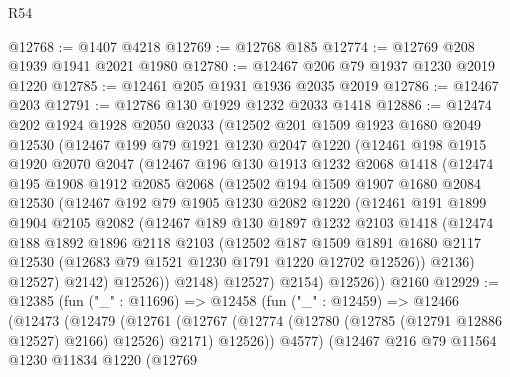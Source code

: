 \begin{lexlean}{R54}
\begin{coremodule}
@12768 := @1407 @4218
@12769 := @12768 @185
@12774 := @12769 @208 @1939 @1941 @2021 @1980
@12780 := @12467 @206 @79 @1937 @1230 @2019 @1220
@12785 := @12461 @205 @1931 @1936 @2035 @2019
@12786 := @12467 @203
@12791 := @12786 @130 @1929 @1232 @2033 @1418
@12886 := @12474
    @202
    @1924
    @1928
    @2050
    @2033
    (@12502
      @201
      @1509
      @1923
      @1680
      @2049
      @12530
      (@12467
        @199
        @79
        @1921
        @1230
        @2047
        @1220
        (@12461
          @198
          @1915
          @1920
          @2070
          @2047
          (@12467
            @196
            @130
            @1913
            @1232
            @2068
            @1418
            (@12474
              @195
              @1908
              @1912
              @2085
              @2068
              (@12502
                @194
                @1509
                @1907
                @1680
                @2084
                @12530
                (@12467
                  @192
                  @79
                  @1905
                  @1230
                  @2082
                  @1220
                  (@12461
                    @191
                    @1899
                    @1904
                    @2105
                    @2082
                    (@12467
                      @189
                      @130
                      @1897
                      @1232
                      @2103
                      @1418
                      (@12474
                        @188
                        @1892
                        @1896
                        @2118
                        @2103
                        (@12502
                          @187
                          @1509
                          @1891
                          @1680
                          @2117
                          @12530
                          (@12683 @79 @1521 @1230 @1791 @1220 @12702 @12526))
                        @2136)
                      @12527)
                    @2142)
                  @12526))
              @2148)
            @12527)
          @2154)
        @12526))
    @2160
@12929 := @12385
    (fun ("_" : @11696) =>
    @12458
      (fun ("_" : @12459) =>
      @12466
        (@12473
          (@12479
            (@12761
              (@12767 (@12774 (@12780 (@12785 (@12791 @12886 @12527) @2166) @12526) @2171) @12526))
            @4577)
          (@12467
            @216
            @79
            @11564
            @1230
            @11834
            @1220
            (@12769

\end{coremodule}
\end{lexlean}
